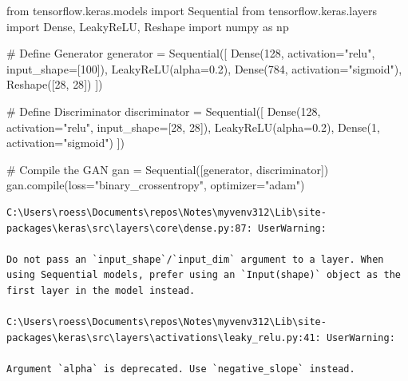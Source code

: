\documentclass[
  letterpaper,
  DIV=11,
  numbers=noendperiod]{scrreprt}
\newenvironment{Shaded}{\begin{snugshade}}{\end{snugshade}}
\newcommand{\BuiltInTok}[1]{\textcolor[rgb]{0.00,0.23,0.31}{#1}}
\newcommand{\CommentTok}[1]{\textcolor[rgb]{0.37,0.37,0.37}{#1}}
\newcommand{\DecValTok}[1]{\textcolor[rgb]{0.68,0.00,0.00}{#1}}
\newcommand{\FloatTok}[1]{\textcolor[rgb]{0.68,0.00,0.00}{#1}}
\newcommand{\ImportTok}[1]{\textcolor[rgb]{0.00,0.46,0.62}{#1}}
\newcommand{\NormalTok}[1]{\textcolor[rgb]{0.00,0.23,0.31}{#1}}
\newcommand{\OperatorTok}[1]{\textcolor[rgb]{0.37,0.37,0.37}{#1}}
\newcommand{\StringTok}[1]{\textcolor[rgb]{0.13,0.47,0.30}{#1}}
\begin{document}
\begin{Shaded}
\begin{Highlighting}[]
\ImportTok{from}\NormalTok{ tensorflow.keras.models }\ImportTok{import}\NormalTok{ Sequential}
\ImportTok{from}\NormalTok{ tensorflow.keras.layers }\ImportTok{import}\NormalTok{ Dense, LeakyReLU, Reshape}
\ImportTok{import}\NormalTok{ numpy }\ImportTok{as}\NormalTok{ np}

\CommentTok{\# Define Generator}
\NormalTok{generator }\OperatorTok{=}\NormalTok{ Sequential([}
\NormalTok{    Dense(}\DecValTok{128}\NormalTok{, activation}\OperatorTok{=}\StringTok{"relu"}\NormalTok{, input\_shape}\OperatorTok{=}\NormalTok{[}\DecValTok{100}\NormalTok{]),}
\NormalTok{    LeakyReLU(alpha}\OperatorTok{=}\FloatTok{0.2}\NormalTok{),}
\NormalTok{    Dense(}\DecValTok{784}\NormalTok{, activation}\OperatorTok{=}\StringTok{"sigmoid"}\NormalTok{),}
\NormalTok{    Reshape([}\DecValTok{28}\NormalTok{, }\DecValTok{28}\NormalTok{])}
\NormalTok{])}

\CommentTok{\# Define Discriminator}
\NormalTok{discriminator }\OperatorTok{=}\NormalTok{ Sequential([}
\NormalTok{    Dense(}\DecValTok{128}\NormalTok{, activation}\OperatorTok{=}\StringTok{"relu"}\NormalTok{, input\_shape}\OperatorTok{=}\NormalTok{[}\DecValTok{28}\NormalTok{, }\DecValTok{28}\NormalTok{]),}
\NormalTok{    LeakyReLU(alpha}\OperatorTok{=}\FloatTok{0.2}\NormalTok{),}
\NormalTok{    Dense(}\DecValTok{1}\NormalTok{, activation}\OperatorTok{=}\StringTok{"sigmoid"}\NormalTok{)}
\NormalTok{])}

\CommentTok{\# Compile the GAN}
\NormalTok{gan }\OperatorTok{=}\NormalTok{ Sequential([generator, discriminator])}
\NormalTok{gan.}\BuiltInTok{compile}\NormalTok{(loss}\OperatorTok{=}\StringTok{"binary\_crossentropy"}\NormalTok{, optimizer}\OperatorTok{=}\StringTok{"adam"}\NormalTok{)}
\end{Highlighting}
\end{Shaded}

\begin{verbatim}
C:\Users\roess\Documents\repos\Notes\myvenv312\Lib\site-packages\keras\src\layers\core\dense.py:87: UserWarning:

Do not pass an `input_shape`/`input_dim` argument to a layer. When using Sequential models, prefer using an `Input(shape)` object as the first layer in the model instead.

C:\Users\roess\Documents\repos\Notes\myvenv312\Lib\site-packages\keras\src\layers\activations\leaky_relu.py:41: UserWarning:

Argument `alpha` is deprecated. Use `negative_slope` instead.
\end{verbatim}
\end{document}

